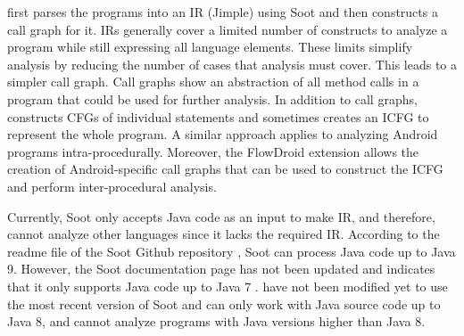 

\cognicryptsast{} first parses the programs into an IR (Jimple) using Soot \cite{soot} and then constructs a call graph for it. IRs generally cover a limited number of constructs to analyze a program while still expressing all language elements. These limits simplify analysis by reducing the number
of cases that analysis must cover. This leads to a simpler call graph. Call graphs show an abstraction of all method calls in a program that could be used for further analysis. In addition to call graphs, \cognicryptsast{} constructs CFGs of individual statements and sometimes creates an ICFG to represent the whole program. A similar approach applies to analyzing Android programs intra-procedurally. Moreover, the FlowDroid \cite{flowdroid} extension allows the creation of Android-specific call graphs that can be used to construct the ICFG and perform inter-procedural analysis.

Currently, Soot only accepts Java code as an input to make IR, and therefore, \cognicryptsast{} cannot analyze other languages since it lacks the required IR. According to the readme file of the Soot Github repository \cite{sootgit}, Soot can process Java code up to Java 9. However, the Soot documentation page has not been updated and indicates that it only supports Java code up to Java 7 \cite{soot}. \cognicryptsast{} have not been modified yet to use the most recent version of Soot and can only work with Java source code up to Java 8, and cannot analyze programs with Java versions higher than Java 8.


